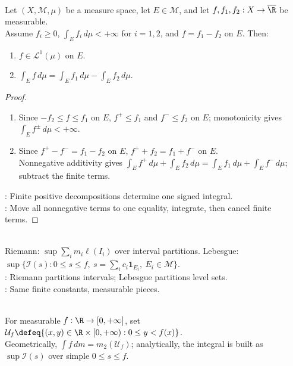 \begin{proposition} \label{prop:signed-integral-independent-of-decomposition} \\
Let $(X,\mathcal{M},\mu)$ be a measure space, let $E\in\mathcal{M}$, and let $f,f_1,f_2:X\to\overline{\R}$ be measurable.\\
Assume $f_i\geq0$, $\int_Ef_i\,d\mu<+\infty$ for $i=1,2$, and $f=f_1-f_2$ on $E$. Then:
\begin{enumerate}[label=(\roman*)]
\setlength{\itemsep}{0pt}
\item $f\in\mathscr{L}^1(\mu)$ on $E$.
\item $\int_E f\,d\mu=\int_E f_1\,d\mu-\int_E f_2\,d\mu$.
\end{enumerate}
\begin{proof}
\begin{enumerate}[label=(\roman*)]
\setlength{\itemsep}{0pt}
\item Since $-f_2\leq f\leq f_1$ on $E$, $f^+\leq f_1$ and $f^-\leq f_2$ on $E$; monotonicity gives $\int_Ef^\pm\,d\mu<+\infty$.
\item Since $f^+-f^-=f_1-f_2$ on $E$, $f^++f_2=f_1+f^-$ on $E$.\\
Nonnegative additivity gives $\int_E f^+\,d\mu+\int_E f_2\,d\mu=\int_E f_1\,d\mu+\int_E f^-\,d\mu$; subtract the finite terms.
\end{enumerate}
: Finite positive decompositions determine one signed integral.\\
: Move all nonnegative terms to one equality, integrate, then cancel finite terms.
\end{proof}
\end{proposition}

\begin{perspective} \label{per:riemann-step-vs-lebesgue-simple} \\
Riemann: $\sup\sum\limits_i m_i\ell(I_i)$ over interval partitions. Lebesgue: $\sup\{\mathcal{I}(s):0\leq s\leq f,\ s=\sum\limits_ic_i\mathbf{1}_{E_i},\ E_i\in\mathcal{M}\}$.\\
: Riemann partitions intervals; Lebesgue partitions level sets.\\
: Same finite constants, measurable pieces.
\end{perspective}

\begin{perspective} \label{per:undergraph-geometric-integral} \\
For measurable $f:\R\to[0,+\infty]$, set $\mathcal{U}_f\defeq\{(x,y)\in\R\times[0,+\infty):0\leq y<f(x)\}$.\\
Geometrically, $\int f\,dm=m_2(\mathcal{U}_f)$; analytically, the integral is built as $\sup\mathcal{I}(s)$ over simple $0\leq s\leq f$.
\end{perspective}

